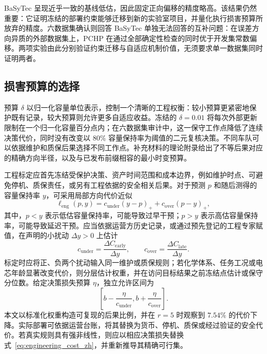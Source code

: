 \documentclass[UTF8,11pt]{ctexart}
\begin{document}
BaSyTec 呈现近乎一致的基线低估，因此固定正向偏移的精度略高。该结果仍然重要：它证明冻结的部署约束能够迁移到新的实验室项目，并量化执行损害预算所放弃的精度。六数据集确认则回答 BaSyTec 单独无法回答的互补问题：在误差方向异质的外部数据集上，PCHP 在通过全部确定性检查的同时优于开发集常数偏移。两项实验由此分别验证约束迁移与自适应机制价值，无须要求单一数据集同时证明两者。

\subsection{损害预算的选择}

预算 $\delta$ 以归一化容量单位表示，控制一个清晰的工程权衡：较小预算更紧密地保护既有记录，较大预算则允许更多自适应收益。冻结的 $\delta=0.01$ 将每次外部更新限制在一个归一化容量百分点内；在六数据集审计中，这一保守工作点降低了连续决策代价，同时没有改变以 $80\%$ 容量保持率为阈值的二元复核决策。不同车队可以依据维护和质保后果选择不同工作点。补充材料的理论附录给出了不等后果对应的精确方向半径，以及与已发布前缀相容的最小时变预算。

工程标定应首先冻结受保护决策、资产时间范围和成本边界，例如维护时点、可避免停机、质保责任，或另有工程依据的安全相关后果。对于预测 $p$ 和随后测得的容量保持率 $y$，可采用局部方向代价近似
\begin{equation}
  \ell_{\mathrm{eng}}(p,y)
  =c_{\mathrm{under}}(y-p)_{+}
  +c_{\mathrm{over}}(p-y)_{+},
  \label{eq:engineering_cost_zh}
\end{equation}
其中，$p<y$ 表示低估容量保持率，可能导致过早干预；$p>y$ 表示高估容量保持率，可能导致延迟干预。应当依据运营方历史记录，或通过预先登记的工程专家赋值，在声明的小扰动 $\Delta y>0$ 上估计
\begin{equation}
  c_{\mathrm{under}}=\frac{\Delta C_{\mathrm{early}}}{\Delta y},
  \qquad
  c_{\mathrm{over}}=\frac{\Delta C_{\mathrm{late}}}{\Delta y}.
  \label{eq:engineering_weights_zh}
\end{equation}
标定时应将正、负两个扰动输入同一维护或质保规则；若化学体系、任务工况或电芯年龄显著改变代价，则分层估计权重，并在访问目标结果之前冻结点估计或保守分位数。给定决策损失预算 $\eta$，独立允许区间为
\begin{equation}
  \left[b-\frac{\eta}{c_{\mathrm{under}}},
        b+\frac{\eta}{c_{\mathrm{over}}}\right].
  \label{eq:engineering_interval_zh}
\end{equation}
本文以标准化权重构造可复现的后果比例，并在 $r=5$ 时观察到 $7.54\%$ 的代价下降。实际部署可依据运营台账，将其替换为货币、停机、质保或经过验证的安全代价。若真实规则具有强非线性，则应以相应决策损失替换式~\eqref{eq:engineering_cost_zh}，并重新推导其精确可行集。
\end{document}
